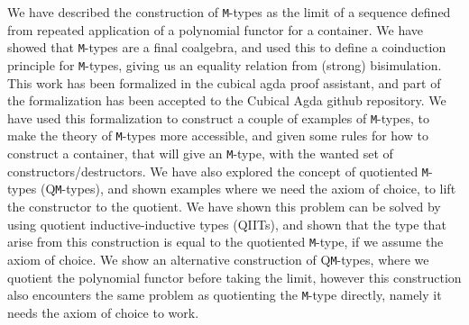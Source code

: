 \documentclass[twoside,11pt,openright]{report}
\theoremstyle{plain} %
\theoremstyle{definition}
\theoremstyle{remark}
\begin{document}
We have described the construction of \texttt{M}-types as the limit of a sequence defined from repeated application of a polynomial functor for a container. We have showed that \texttt{M}-types are a final coalgebra, and used this to define a coinduction principle for \texttt{M}-types, giving us an equality relation from (strong) bisimulation. This work has been formalized in the cubical agda proof assistant, and part of the formalization has been accepted to the Cubical Agda github repository. We have used this formalization to construct a couple of examples of \texttt{M}-types, to make the theory of \texttt{M}-types more accessible, and given some rules for how to construct a container, that will give an \texttt{M}-type, with the wanted set of constructors/destructors. We have also explored the concept of quotiented \texttt{M}-types (Q\texttt{M}-types), and shown examples where we need the axiom of choice, to lift the constructor to the quotient. We have shown this problem can be solved by using quotient inductive-inductive types (QIITs), and shown that the type that arise from this construction is equal to the quotiented \texttt{M}-type, if we assume the axiom of choice. We show an alternative construction of Q\texttt{M}-types, where we quotient the polynomial functor before taking the limit, however this construction also encounters the same problem as quotienting the \texttt{M}-type directly, namely it needs the axiom of choice to work.

\end{document}
